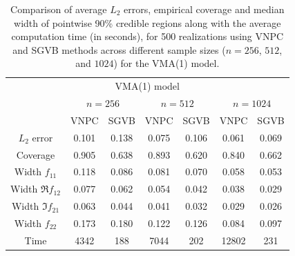\documentclass[%
 reprint,
 amsmath,amssymb,
 aps,
]{revtex4-2}
\begin{document}
\begin{table}[h]
\centering
\begin{tabular}{ccccccc}
\hline
\multicolumn{7}{c}{VMA(1) model}\\
\quad & \multicolumn{2}{c}{$n=256$}  & \multicolumn{2}{c}{$n = 512$}  & \multicolumn{2}{c}{$n = 1024$}\\
\hline
\quad & {VNPC} & {SGVB} & {VNPC} & {SGVB} & {VNPC} & {SGVB}\\
{$L_2$ error} & 0.101 & 0.138 & 0.075 & 0.106 & 0.061 & 0.069\\
{Coverage} & 0.905 & 0.638 & 0.893 & 0.620 & 0.840 & 0.662\\
{Width $f_{11}$} & 0.118 & 0.086 & 0.081 & 0.070 & 0.058 & 0.053\\
{Width $\Re f_{12}$} & 0.077 & 0.062 & 0.054 & 0.042 & 0.038 & 0.029\\
{Width $\Im f_{21}$} & 0.063 & 0.044 & 0.041 & 0.032 & 0.029 & 0.026\\
{Width $f_{22}$} & 0.173 & 0.180 & 0.122 & 0.126 & 0.084 & 0.097\\
{Time} & 4342 & 188 & 7044 & 202 & 12802 & 231\\
\hline
\end{tabular}
\caption{{\small Comparison of average $L_2$ errors, empirical coverage and median width of pointwise 90\%
credible regions along with the average computation time (in seconds), for 500 realizations using VNPC and SGVB methods across different sample sizes ($n=256$, $512$, and $1024$) for the VMA(1) model.}}
\label{table l1l2 vma1} 
\end{table}
\endgroup
\end{document}
